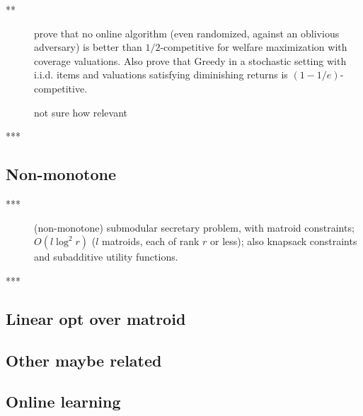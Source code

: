 \documentclass{article}
\begin{document}
\begin{description}
\item[\citet{kapralov13}**] prove that no online algorithm (even randomized, against an oblivious adversary) is better than $1/2$-competitive for welfare maximization with coverage valuations. Also prove that Greedy in a stochastic setting with i.i.d. items and valuations satisfying diminishing returns is $(1-1/e)$-competitive.
\item[\citet{buchbinder12}] not sure how relevant
\item[\citet{feldman11sec}***] 
\end{description}


\subsection{Non-monotone}

\begin{description}
\item[\cite{bateni10}***] (non-monotone) submodular secretary problem, with matroid constraints; $O(l \log^2 r)$ ($l$ matroids, each of rank $r$ or less); also knapsack constraints and subadditive utility functions.
\item[\citet{gupta10}***] 
\end{description}

\subsection{Linear opt over matroid}
\begin{description}
\item[\citet{babaioff}]
\item[\citet{ogharan11}]
\item[\citet{imXX}] 
\end{description}

\subsection{Other maybe related}
\begin{description}
\item[\citet{feldman12parallel}] 
\end{description}


\subsection{Online learning}
\end{document}
